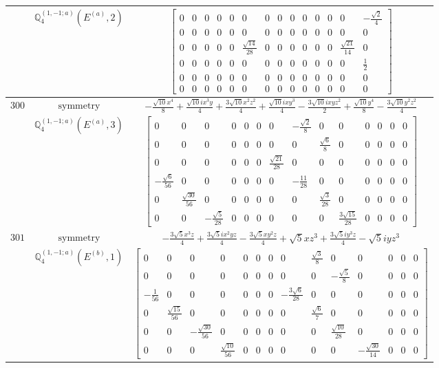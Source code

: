 \documentclass[fleqn,8pt,landscape]{jsarticle}
\begin{document}
\begin{longtable}{ccc}
$  $ & $ \mathbb{Q}_{4}^{(1,-1;a)}(E^{(a)},2) $ & $ \begin{bmatrix} 0 & 0 & 0 & 0 & 0 & 0 & 0 & 0 & 0 & 0 & 0 & 0 & 0 & - \frac{\sqrt{2}}{4} \\ 0 & 0 & 0 & 0 & 0 & 0 & 0 & 0 & 0 & 0 & 0 & 0 & 0 & 0 \\ 0 & 0 & 0 & 0 & 0 & \frac{\sqrt{14}}{28} & 0 & 0 & 0 & 0 & 0 & 0 & \frac{\sqrt{21}}{14} & 0 \\ 0 & 0 & 0 & 0 & 0 & 0 & 0 & 0 & 0 & 0 & 0 & 0 & 0 & \frac{1}{2} \\ 0 & 0 & 0 & 0 & 0 & 0 & 0 & 0 & 0 & 0 & 0 & 0 & 0 & 0 \\ 0 & 0 & 0 & 0 & 0 & 0 & 0 & 0 & 0 & 0 & 0 & 0 & 0 & 0 \end{bmatrix} $ \\ \hline
$ 300 $ & $ \text{symmetry} $ & $ - \frac{\sqrt{10} x^{4}}{8} + \frac{\sqrt{10} i x^{3} y}{4} + \frac{3 \sqrt{10} x^{2} z^{2}}{4} + \frac{\sqrt{10} i x y^{3}}{4} - \frac{3 \sqrt{10} i x y z^{2}}{2} + \frac{\sqrt{10} y^{4}}{8} - \frac{3 \sqrt{10} y^{2} z^{2}}{4} $ \\
$  $ & $ \mathbb{Q}_{4}^{(1,-1;a)}(E^{(a)},3) $ & $ \begin{bmatrix} 0 & 0 & 0 & 0 & 0 & 0 & 0 & - \frac{\sqrt{2}}{8} & 0 & 0 & 0 & 0 & 0 & 0 \\ 0 & 0 & 0 & 0 & 0 & 0 & 0 & 0 & \frac{\sqrt{6}}{8} & 0 & 0 & 0 & 0 & 0 \\ 0 & 0 & 0 & 0 & 0 & 0 & \frac{\sqrt{21}}{28} & 0 & 0 & 0 & 0 & 0 & 0 & 0 \\ - \frac{\sqrt{6}}{56} & 0 & 0 & 0 & 0 & 0 & 0 & - \frac{11}{28} & 0 & 0 & 0 & 0 & 0 & 0 \\ 0 & \frac{\sqrt{30}}{56} & 0 & 0 & 0 & 0 & 0 & 0 & \frac{\sqrt{3}}{28} & 0 & 0 & 0 & 0 & 0 \\ 0 & 0 & - \frac{\sqrt{5}}{28} & 0 & 0 & 0 & 0 & 0 & 0 & \frac{3 \sqrt{15}}{28} & 0 & 0 & 0 & 0 \end{bmatrix} $ \\ \hline
$ 301 $ & $ \text{symmetry} $ & $ - \frac{3 \sqrt{5} x^{3} z}{4} + \frac{3 \sqrt{5} i x^{2} y z}{4} - \frac{3 \sqrt{5} x y^{2} z}{4} + \sqrt{5} x z^{3} + \frac{3 \sqrt{5} i y^{3} z}{4} - \sqrt{5} i y z^{3} $ \\
$  $ & $ \mathbb{Q}_{4}^{(1,-1;a)}(E^{(b)},1) $ & $ \begin{bmatrix} 0 & 0 & 0 & 0 & 0 & 0 & 0 & 0 & \frac{\sqrt{3}}{8} & 0 & 0 & 0 & 0 & 0 \\ 0 & 0 & 0 & 0 & 0 & 0 & 0 & 0 & 0 & - \frac{\sqrt{5}}{8} & 0 & 0 & 0 & 0 \\ - \frac{1}{56} & 0 & 0 & 0 & 0 & 0 & 0 & - \frac{3 \sqrt{6}}{28} & 0 & 0 & 0 & 0 & 0 & 0 \\ 0 & \frac{\sqrt{15}}{56} & 0 & 0 & 0 & 0 & 0 & 0 & \frac{\sqrt{6}}{7} & 0 & 0 & 0 & 0 & 0 \\ 0 & 0 & - \frac{\sqrt{30}}{56} & 0 & 0 & 0 & 0 & 0 & 0 & \frac{\sqrt{10}}{28} & 0 & 0 & 0 & 0 \\ 0 & 0 & 0 & \frac{\sqrt{10}}{56} & 0 & 0 & 0 & 0 & 0 & 0 & - \frac{\sqrt{30}}{14} & 0 & 0 & 0 \end{bmatrix} $ \\ \hline

\end{longtable}
\end{document}
